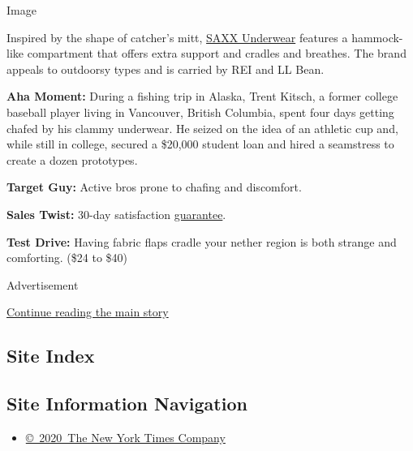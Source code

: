 Image

Inspired by the shape of catcher's mitt,
\href{https://re-invented.saxxunderwear.com/}{SAXX Underwear} features a
hammock-like compartment that offers extra support and cradles and
breathes. The brand appeals to outdoorsy types and is carried by REI and
LL Bean.

\textbf{Aha Moment:} During a fishing trip in Alaska, Trent Kitsch, a
former college baseball player living in Vancouver, British Columbia,
spent four days getting chafed by his clammy underwear. He seized on the
idea of an athletic cup and, while still in college, secured a \$20,000
student loan and hired a seamstress to create a dozen prototypes.

\textbf{Target Guy:} Active bros prone to chafing and discomfort.

\textbf{Sales Twist:} 30-day satisfaction
\href{https://www.saxxunderwear.com/pages/comfort-guarantee}{guarantee}.

\textbf{Test Drive:} Having fabric flaps cradle your nether region is
both strange and comforting. (\$24 to \$40)

Advertisement

\protect\hyperlink{after-bottom}{Continue reading the main story}

\hypertarget{site-index}{%
\subsection{Site Index}\label{site-index}}

\hypertarget{site-information-navigation}{%
\subsection{Site Information
Navigation}\label{site-information-navigation}}

\begin{itemize}
\tightlist
\item
  \href{https://help.nytimes.com/hc/en-us/articles/115014792127-Copyright-notice}{©~2020~The
  New York Times Company}
\end{itemize}

